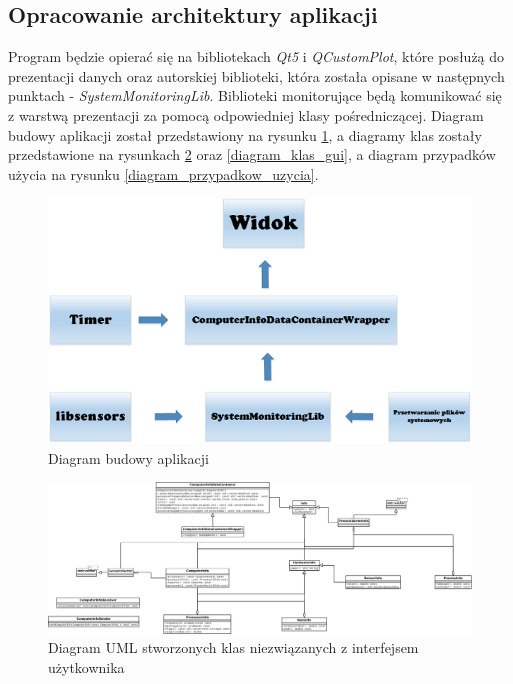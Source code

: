 \documentclass[a4paper]{article}
\begin{document}
\subsection{Opracowanie architektury aplikacji}
Program będzie opierać się na bibliotekach \textit{Qt5} i \textit{QCustomPlot}, które posłużą do prezentacji danych oraz autorskiej biblioteki, która została opisane w następnych punktach - \textit{SystemMonitoringLib}. Biblioteki monitorujące będą komunikować się z warstwą prezentacji za pomocą odpowiedniej klasy pośredniczącej. Diagram budowy aplikacji został przedstawiony na rysunku \ref{diagram_budowy_aplikacji}, a diagramy klas zostały przedstawione na rysunkach \ref{diagram_klas_system_monitoring} oraz \ref{diagram_klas_gui}, a diagram przypadków użycia na rysunku \ref{diagram_przypadkow_uzycia}.

\begin{figure}[h]
	\centering
	\includegraphics[width=\linewidth]{img/diagramBudowyAplikacji.png}
	\caption{Diagram budowy aplikacji}
	\label{diagram_budowy_aplikacji}
\end{figure}


\begin{figure}[h]
	\centering
	\includegraphics[width=0.75\paperheight, angle=90]{img/diagramKlas.png}
	\caption{Diagram UML stworzonych klas niezwiązanych z interfejsem użytkownika}
	\label{diagram_klas_system_monitoring}
\end{figure}
\end{document}
